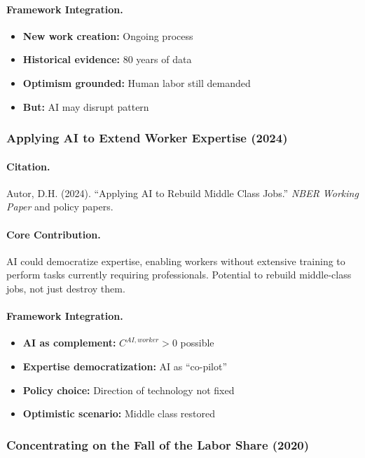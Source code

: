 \paragraph{Framework Integration.}
\begin{itemize}
  \item \textbf{New work creation:} Ongoing process
  \item \textbf{Historical evidence:} 80 years of data
  \item \textbf{Optimism grounded:} Human labor still demanded
  \item \textbf{But:} AI may disrupt pattern
\end{itemize}

\subsubsection{Applying AI to Extend Worker Expertise (2024)}

\paragraph{Citation.}
Autor, D.H. (2024). ``Applying AI to Rebuild Middle Class Jobs.''
\emph{NBER Working Paper} and policy papers.

\paragraph{Core Contribution.}
AI could democratize expertise, enabling workers without extensive
training to perform tasks currently requiring professionals.
Potential to rebuild middle-class jobs, not just destroy them.

\paragraph{Framework Integration.}
\begin{itemize}
  \item \textbf{AI as complement:} $C^{AI,worker} > 0$ possible
  \item \textbf{Expertise democratization:} AI as ``co-pilot''
  \item \textbf{Policy choice:} Direction of technology not fixed
  \item \textbf{Optimistic scenario:} Middle class restored
\end{itemize}

\subsubsection{Concentrating on the Fall of the Labor Share (2020)}

